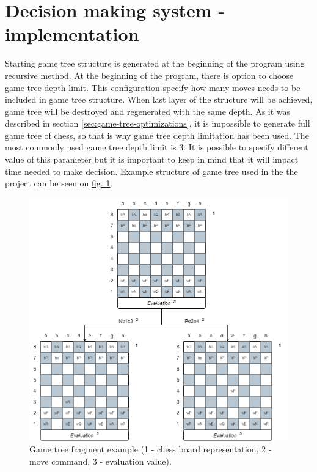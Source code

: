 \section{Decision making system - implementation}
Starting game tree structure is generated at the beginning of the program using recursive method. At the beginning of the program, there is option to choose game tree depth limit. This configuration specify how many moves needs to be included in game tree structure. When last layer of the structure will be achieved, game tree will be destroyed and regenerated with the same depth. As it was described in section \ref{sec:game-tree-optimizations}, it is impossible to generate full game tree of chess, so that is why game tree depth limitation has been used. The most commonly used game tree depth limit is $3$. It is possible to specify different value of this parameter but it is important to keep in mind that it will impact time needed to make decision. Example structure of game tree used in the the project can be seen on \hyperref[fig:game-tree-fragment]{fig. \ref*{fig:game-tree-fragment}}.
\begin{figure}
	\centering
	\includegraphics[width=\textwidth]{dependencies/pictures/Game_Tree_Fragment_Example.png}
	\caption{Game tree fragment example (1 - chess board representation, 2 - move command, 3 - evaluation value).}
	\label{fig:game-tree-fragment}
\end{figure}

